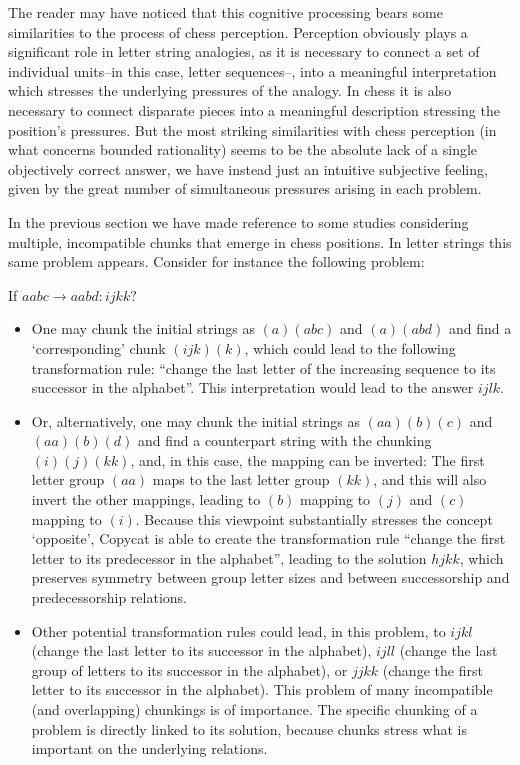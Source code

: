 \documentclass[a4paper]{article}
\begin{document}
The reader may have noticed that this cognitive processing bears some similarities to the process of chess perception.  Perception obviously plays a significant role in letter string analogies, as it is necessary to connect a set of individual units--in this case, letter sequences--, into a meaningful interpretation which stresses the underlying pressures of the analogy. In chess it is also necessary to connect disparate pieces into a meaningful description stressing the position’s pressures.   But the most striking similarities with chess perception (in what concerns bounded rationality) seems to be the absolute lack of a single objectively correct answer, we have instead just an intuitive subjective feeling, given by the great number of simultaneous pressures arising in each problem.  

In the previous section we have made reference to some studies considering multiple, incompatible chunks that emerge in chess positions. In letter strings this same problem appears.  Consider for instance the following problem:  

If $aabc\to aabd: ijkk?$  

\begin{itemize}
\item One may chunk the initial strings as $(a)(abc)$ and $(a)(abd)$ and find a `corresponding’ chunk $(ijk)(k)$, which could lead to the following transformation rule: “change the last letter of the increasing sequence to its successor in the alphabet”. This interpretation would lead to the answer $ijlk$.

\item Or, alternatively, one may chunk the initial strings as $(aa)(b)(c)$ and $(aa)(b)(d)$ and find a counterpart string with the chunking $(i)(j)(kk)$, and, in this case, the mapping can be inverted:  The first letter group $(aa)$ maps to the last letter group $(kk)$, and this will also invert the other mappings, leading to $(b)$ mapping to $(j)$ and $(c)$ mapping to $(i)$.  Because this viewpoint substantially stresses the concept `opposite’, Copycat is able to create the transformation rule “change the first letter to its predecessor in the alphabet”, leading to the solution $hjkk$, which preserves symmetry between group letter sizes and between successorship and predecessorship relations.

\item Other potential transformation rules could lead, in this problem, to $ijkl$ (change the last letter to its successor in the alphabet), $ijll$ (change the last group of letters to its successor in the alphabet), or $jjkk$ (change the first letter to its successor in the alphabet). This problem of many incompatible (and overlapping) chunkings is of importance.  The specific chunking of a problem is directly linked to its solution, because chunks stress what is important on the underlying relations. 
\end{itemize}
\end{document}
